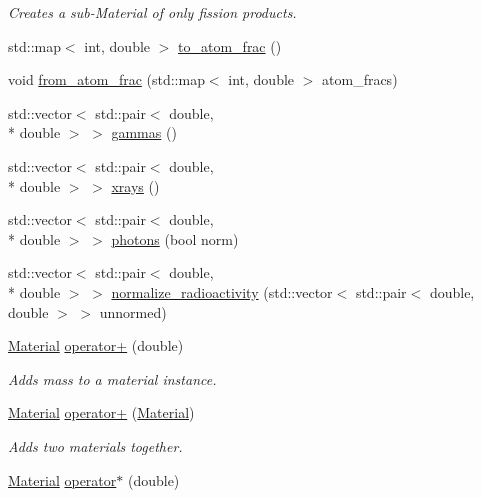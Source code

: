 \begin{DoxyCompactItemize}
\begin{DoxyCompactList}\small\item\em Creates a sub-\/\+Material of only fission products. \end{DoxyCompactList}\item 
std\+::map$<$ int, double $>$ \hyperlink{classpyne_1_1_material_a89a5ef5a4bfca961981a46a4252299fd}{to\+\_\+atom\+\_\+frac} ()
\item 
void \hyperlink{classpyne_1_1_material_a2db9572599c20eb0d17bd0993766f792}{from\+\_\+atom\+\_\+frac} (std\+::map$<$ int, double $>$ atom\+\_\+fracs)
\item 
std\+::vector$<$ std\+::pair$<$ double, \\*
double $>$ $>$ \hyperlink{classpyne_1_1_material_a2e2721b8ec8fde2d2e08379b39220d00}{gammas} ()
\item 
std\+::vector$<$ std\+::pair$<$ double, \\*
double $>$ $>$ \hyperlink{classpyne_1_1_material_a24fbf883f1623dccc4053106041510d5}{xrays} ()
\item 
std\+::vector$<$ std\+::pair$<$ double, \\*
double $>$ $>$ \hyperlink{classpyne_1_1_material_a3630f6f54a7ff6355da0b76b4d0e35a1}{photons} (bool norm)
\item 
std\+::vector$<$ std\+::pair$<$ double, \\*
double $>$ $>$ \hyperlink{classpyne_1_1_material_a114deb10e8d118bbd37ade0fbce5253d}{normalize\+\_\+radioactivity} (std\+::vector$<$ std\+::pair$<$ double, double $>$ $>$ unnormed)
\item 
\hypertarget{classpyne_1_1_material_a97bae8b18322f26e1cd87d8909ce42b6}{\hyperlink{classpyne_1_1_material}{Material} \hyperlink{classpyne_1_1_material_a97bae8b18322f26e1cd87d8909ce42b6}{operator+} (double)}\label{classpyne_1_1_material_a97bae8b18322f26e1cd87d8909ce42b6}

\begin{DoxyCompactList}\small\item\em Adds mass to a material instance. \end{DoxyCompactList}\item 
\hypertarget{classpyne_1_1_material_a1913e1a1b525352bf4f0b4155b6d39b7}{\hyperlink{classpyne_1_1_material}{Material} \hyperlink{classpyne_1_1_material_a1913e1a1b525352bf4f0b4155b6d39b7}{operator+} (\hyperlink{classpyne_1_1_material}{Material})}\label{classpyne_1_1_material_a1913e1a1b525352bf4f0b4155b6d39b7}

\begin{DoxyCompactList}\small\item\em Adds two materials together. \end{DoxyCompactList}\item 
\hypertarget{classpyne_1_1_material_a6a924c97822bc791e0b47d4940c8bea3}{\hyperlink{classpyne_1_1_material}{Material} \hyperlink{classpyne_1_1_material_a6a924c97822bc791e0b47d4940c8bea3}{operator$\ast$} (double)}\label{classpyne_1_1_material_a6a924c97822bc791e0b47d4940c8bea3}


\end{DoxyCompactItemize}
